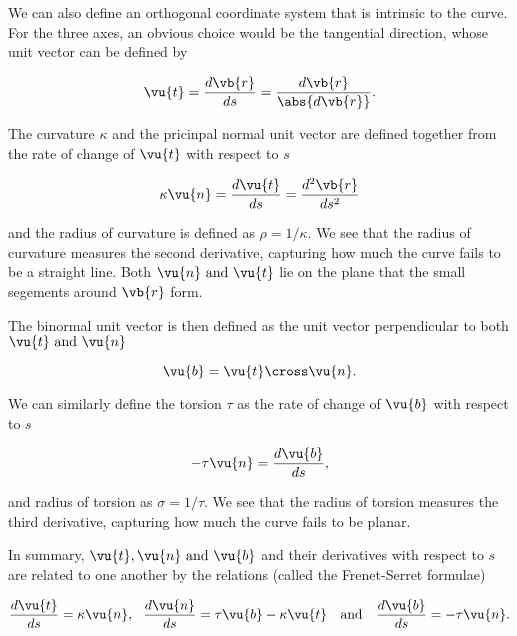 \documentclass[english,a4paper,12pt]{report}
\begin{document}
We can also define an orthogonal coordinate system that is intrinsic to the curve. For the three axes, an obvious choice would be the tangential direction, whose unit vector can be defined by

\begin{equation}
	\vu{t} = \frac{d\vb{r} }{ds} = \frac{d \vb{r} }{\abs{d \vb{r} } }.
\end{equation}

The curvature \(\kappa \) and the pricinpal normal unit vector are defined together from the rate of change of \(\vu{t} \) with respect to \(s\)

\begin{equation}
	\kappa \vu{n}  = \frac{d \vu{t} }{ds} = \frac{d^2\vb{r} }{ds^2}
\end{equation}

and the radius of curvature is defined as \(\rho = 1/\kappa  \). We see that the radius of curvature measures the second derivative, capturing how much the curve fails to be a straight line. Both \(\vu{n} \text { and } \vu{t} \) lie on the plane that the small segements around \(\vb{r} \) form.  

The binormal unit vector is then defined as the unit vector perpendicular to both \(\vu{t}  \text { and } \vu{n} \) 

\begin{equation}
	\vu{b} = \vu{t} \cross \vu{n} .
\end{equation}

We can similarly define the torsion \(\tau \) as the rate of change of \(\vu{b} \) with respect to \(s\)  

\begin{equation}
	-\tau \vu{n} =  \frac{d \vu{b} }{ds}, 
\end{equation}

and radius of torsion as \(\sigma  = 1/ \tau  \). We see that the radius of torsion measures the third derivative, capturing how much the curve fails to be planar.

In summary, \(\vu{t} , \vu{n} \text { and } \vu{b} \) and their derivatives with respect to \(s\) are related to one another by the relations (called the Frenet-Serret formulae) 

\begin{equation}
	\frac{d \vu{t} }{ds} = \kappa \vu{n} , ~~\frac{d \vu{n} }{ds} = \tau \vu{b} - \kappa \vu{t}~~ \text { and } ~~\frac{d \vu{b} }{ds} = -\tau \vu{n} .  
\end{equation}
\end{document}
